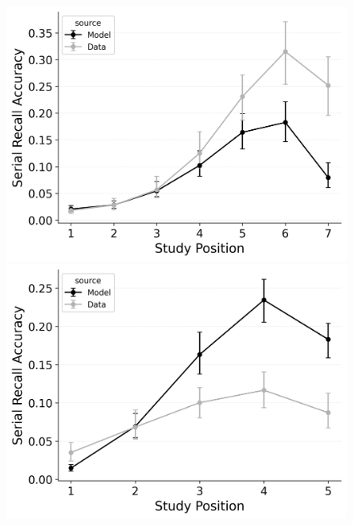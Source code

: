 \documentclass[
  man,
  floatsintext,
  longtable,
  nolmodern,
  notxfonts,
  notimes,
  draftfirst,
  colorlinks=true,linkcolor=blue,citecolor=blue,urlcolor=blue]{apa7}
\begin{document}
\begin{figure}
%
\begin{minipage}{0.33\linewidth}
\includegraphics{figures/bw_Gordon2021_CRU_with_Pre-Expt_and_Primacy_Confusable_Fitting_intrusion_error_rate_LL7.png}\end{minipage}%
\newline
\begin{minipage}{0.33\linewidth}
\includegraphics{figures/bw_Gordon2021_CRU_with_Pre-Expt_and_Primacy_Confusable_Fitting_order_error_rate_LL5.png}\end{minipage}%
%
\begin{minipage}{0.33\linewidth}

\end{minipage}
\end{figure}
\end{document}
